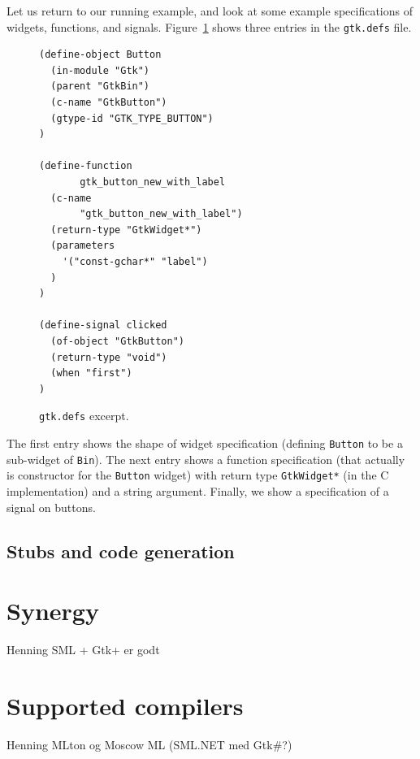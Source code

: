 \documentclass[workingdraft,endnotes]{usetex-v1}
\begin{document}
Let us return to our running example, and look at some example
specifications of widgets, functions, and signals. Figure~\ref{fig:gtk-defs}
shows three entries in the \texttt{gtk.defs} file.
\begin{figure}[htbp]
\begin{centering}
\begin{verbatim}
(define-object Button
  (in-module "Gtk")
  (parent "GtkBin")
  (c-name "GtkButton")
  (gtype-id "GTK_TYPE_BUTTON")
)

(define-function 
       gtk_button_new_with_label
  (c-name 
       "gtk_button_new_with_label")
  (return-type "GtkWidget*")
  (parameters
    '("const-gchar*" "label")
  )
)

(define-signal clicked
  (of-object "GtkButton")
  (return-type "void")
  (when "first")
)
\end{verbatim}
\caption{\texttt{gtk.defs} excerpt.\label{fig:gtk-defs}}
\end{centering}
\end{figure}
The first entry shows the shape of widget specification (defining
\texttt{Button} to be a sub-widget of \texttt{Bin}). The next entry
shows a function specification (that actually is constructor for the
\texttt{Button} widget) with return type \texttt{GtkWidget*} (in the C
implementation) and a string argument. Finally, we show a specification
of a signal on buttons.

\subsection{Stubs and code generation}
\label{sec:stubs-code-gener}





\section{Synergy}
\label{sec:synergy}

\begin{ednote}{Henning}
  SML + Gtk+ er godt
\end{ednote}



\section{Supported \sml compilers}
\label{sec:supp-sml-comp}

\begin{ednote}{Henning}
  MLton og Moscow ML (SML.NET med Gtk\#?)
\end{ednote}
\end{document}
